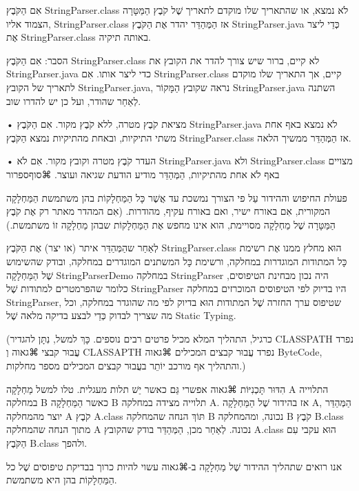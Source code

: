 אִם הַקֹּבֶץ StringParser.class לֹא נמצא, או שהתאריך שלו מוקדם לתאריך שֶׁל קֹבֶץ
הַמַּטָּרָה הצמוד אליו, StringParser.class אז הַמְּהַדֵּר יהדר אֶת הַקֹּבֶץ
StringParser.java כְּדֵי ליצר אֶת StringParser.class באותה תיקיה.

הסבר: אִם הַקֹּבֶץ StringParser.class לא קיים, ברור שיש צורך להדר את הקובץ את
StringParser.java כדי ליצר אותו. אִם StringParser.class קיים, אך התאריך שלו
מוקדם לתאריך של הקובץ StringParser.java, נראה שקובץ הַמָּקוֹר StringParser.java
השתנה לְאַחַר שהודר, ועל כן יש להדרו שוב.

• מציאת קֹבֶץ מטרה, ללא קֹבֶץ מקור. אִם הַקֹּבֶץ StringParser.java לֹא נמצא באף
אחת משתי התיקיות, ובאחת מהתיקיות נמצא הַקֹּבֶץ StringParser.class אז הַמְּהַדֵּר
ממשיך הלאה.

• העדר קֹבֶץ מטרה וקובץ מקור. אִם לֹא StringParser.java ולא StringParser.class
מצויים באף לֹא אחת מהתיקיות, הַמְּהַדֵּר מודיע הודעת שגיאה ועוצר.
⌘סוף{ספרור}

פעולת החיפוש וההידור עַל פי הצורך נמשכת עד אֲשֶׁר כָּל הַמַּחְלָקוֹת בהן משתמשת
הַמַּחְלָקָה המקורית, אִם באורח ישיר, ואם באורח עקיף, מהודרות. (אִם המהדר מאתר
רק אֶת קֹבֶץ הַמַּטָּרָה שֶׁל מַחְלָקָה מסויימת, הוא אינו מחפש אֶת הַמַּחְלָקוֹת
שבהן מַחְלָקָה זוֹ משתמשת.)

לְאַחַר שהַמְּהַדֵּר איתר (או יצר) אֶת הַקֹּבֶץ StringParser.class הוּא מחלץ
ממנו אֶת רשימת כָּל המתודות המוגדרות במחלקה, ורשימת כָּל המשתנים המוגדרים
במחלקה, ובודק שהשימוש שֶׁל הַמַּחְלָקָה StringParserDemo במחלקה StringParser היה
נכון מבחינת הטיפוסים, כלומר שהפרמטרים למתודות שֶׁל StringParser היו בדיוק לפי
הטיפוסים המוכרזים במחלקה StringParser, שטיפוס ערך החזרה שֶׁל המתודות הוּא בדיוק
לפי מה שהוגדר במחלקה, וכל מה שצריך לבדוק כְּדֵי לבצע בדיקה מלאה שֶׁל Static
Typing.

(כרגיל, התהליך המלא מכיל פרטים רבים נוספים. כָּךְ למשל, נִתָּן להגדיר CLASSPATH
נפרד עֲבוּר קבצי ⌘גאוה וְ CLASSAPTH נפרד עֲבוּר קבצים המכילים ⌘גאוה ByteCode,
והתהליך אף מורכב יוֹתֵר בעֲבוּר קבצים המכילים מספר מחלקות.)

הִדּוּר תָּכְנִיּוֹת ⌘גאוה אפשרי גַּם כאשר יֵשׁ תלות מעגלית. טלו למשל מַחְלָקָה A
התלוייה במחלקה B כאשר הַמַּחְלָקָה B תלוייה מצידה במחלקה A. אז בהידור שֶׁל
הַמַּחְלָקָה A, הַמְּהַדֵּר יוצר מהמחלקה A קֹבֶץ A.class תּוֹךְ הנחה שהמחלקה B
נכונה, ומהמחלקה B קֹבֶץ B.class מתוך הנחה שהמחלקה A נכונה. לְאַחַר מכן,
הַמְּהַדֵּר בודק שהקובץ A.class הוּא עקבי עִם הַקֹּבֶץ B.class ולהפך.

אנו רואים שתהליך ההידור שֶׁל מַחְלָקָה ב-⌘גאוה עשוי להיות כרוך בבדיקת טיפוסים
שֶׁל כל הַמַּחְלָקוֹת בהן היא משתמשת.

